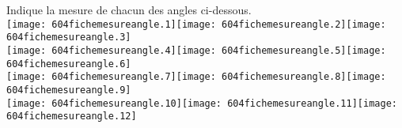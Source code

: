 Indique la mesure de chacun des angles ci-dessous.
\\
\texttt{[image: 604fichemesureangle.1]}\hfill\texttt{[image: 604fichemesureangle.2]}\hfill\texttt{[image: 604fichemesureangle.3]}
\\
\texttt{[image: 604fichemesureangle.4]}\hfill\texttt{[image: 604fichemesureangle.5]}\hfill\texttt{[image: 604fichemesureangle.6]}
\\
\texttt{[image: 604fichemesureangle.7]}\hfill\texttt{[image: 604fichemesureangle.8]}\hfill\texttt{[image: 604fichemesureangle.9]}
\\
\texttt{[image: 604fichemesureangle.10]}\hfill\texttt{[image: 604fichemesureangle.11]}\hfill\texttt{[image: 604fichemesureangle.12]}
